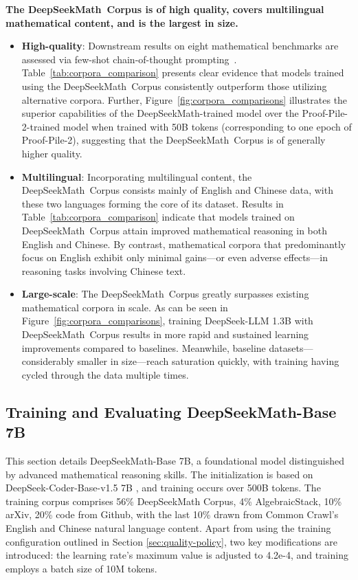 \begin{itemize}[topsep=0pt]
\textbf{The DeepSeekMath~Corpus is of high quality, covers multilingual mathematical content, and is the largest in size.}

\begin{itemize}[topsep=0pt]
    \item \textbf{High-quality}: Downstream results on eight mathematical benchmarks are assessed via few-shot chain-of-thought prompting~\cite{cot}. Table~\ref{tab:corpora_comparison} presents clear evidence that models trained using the DeepSeekMath~Corpus consistently outperform those utilizing alternative corpora. Further, Figure~\ref{fig:corpora_comparisons} illustrates the superior capabilities of the DeepSeekMath-trained model over the Proof-Pile-2-trained model when trained with 50B tokens (corresponding to one epoch of Proof-Pile-2), suggesting that the DeepSeekMath~Corpus is of generally higher quality.
    \item \textbf{Multilingual}: Incorporating multilingual content, the DeepSeekMath~Corpus consists mainly of English and Chinese data, with these two languages forming the core of its dataset. Results in Table~\ref{tab:corpora_comparison} indicate that models trained on DeepSeekMath~Corpus attain improved mathematical reasoning in both English and Chinese. By contrast, mathematical corpora that predominantly focus on English exhibit only minimal gains—or even adverse effects—in reasoning tasks involving Chinese text.
    \item \textbf{Large-scale}: The DeepSeekMath~Corpus greatly surpasses existing mathematical corpora in scale. As can be seen in Figure~\ref{fig:corpora_comparisons}, training DeepSeek-LLM 1.3B with DeepSeekMath~Corpus results in more rapid and sustained learning improvements compared to baselines. Meanwhile, baseline datasets—considerably smaller in size—reach saturation quickly, with training having cycled through the data multiple times.
\end{itemize}

\subsection{Training and Evaluating DeepSeekMath-Base 7B}

This section details DeepSeekMath-Base 7B, a foundational model distinguished by advanced mathematical reasoning skills. The initialization is based on DeepSeek-Coder-Base-v1.5 7B \citep{deepseek-coder}, and training occurs over 500B tokens. The training corpus comprises 56\% DeepSeekMath Corpus, 4\% AlgebraicStack, 10\% arXiv, 20\% code from Github, with the last 10\% drawn from Common Crawl’s English and Chinese natural language content. Apart from using the training configuration outlined in Section \ref{sec:quality-policy}, two key modifications are introduced: the learning rate’s maximum value is adjusted to 4.2e-4, and training employs a batch size of 10M tokens.


\end{itemize}
